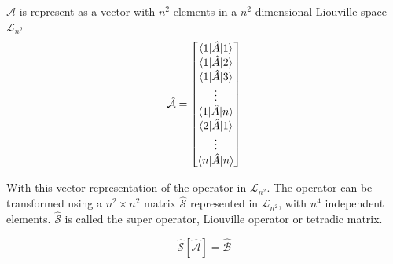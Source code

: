 \documentclass[11pt,a4paper]{article}
\begin{document}
$\hat{\mathcal{A}}$ is represent as a vector with $n^2$ elements in a $n^2$-dimensional Liouville space $\mathcal{L}_{n^2}$
\begin{equation}
\hat{\mathcal{A}} =
 \begin{bmatrix}
  \braket{ 1 | \hat{A}|1 }\\
  \braket{ 1 | \hat{A}|2 }\\
  \braket{ 1 | \hat{A}|3 }\\
  \vdots\\
  \braket{ 1 | \hat{A}|n }\\
  \braket{ 2 | \hat{A}|1 }\\
  \vdots\\
  \braket{ n | \hat{A}|n }\\
 \end{bmatrix}
\end{equation}

With this vector representation of the operator in $\mathcal{L}_{n^2}$. The operator can be transformed using a $n^2 \times n^2$ matrix $\hat{\mathcal{S}}$ represented in $\mathcal{L}_{n^2}$, with $n^4$ independent elements. $\hat{\mathcal{S}}$ is called the super operator, Liouville operator or tetradic matrix.

\begin{equation}
\hat{\mathcal{S}} \left[ \hat{\mathcal{A}} \right] = \hat{\mathcal{B}}
\end{equation}
\end{document}
